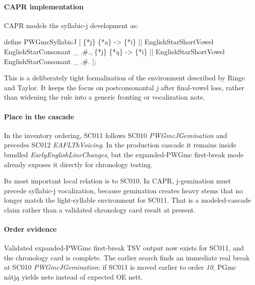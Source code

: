\documentclass[
  british,
  a4paper,
]{article}
\newenvironment{Shaded}{}{}
\newcommand{\NormalTok}[1]{#1}
\begin{document}
\paragraph{CAPR implementation}\label{capr-implementation-8}

CAPR models the syllabic-j development as:

\begin{Shaded}
\begin{Highlighting}[]
\NormalTok{define PWGmcSyllabicJ [}
\NormalTok{    \{*j\} \{*a\} {-}\textgreater{} \{*i\} || EnglishStarShortVowel EnglishStarConsonant \_ .\#.,}
\NormalTok{    \{*j\} \{*ą\} {-}\textgreater{} \{*i\} || EnglishStarShortVowel EnglishStarConsonant \_ .\#.}
\NormalTok{];}
\end{Highlighting}
\end{Shaded}

This is a deliberately tight formalization of the environment described
by Ringe and Taylor. It keeps the focus on postconsonantal \emph{j}
after final-vowel loss, rather than widening the rule into a generic
fronting or vocalization note.

\paragraph{Place in the cascade}\label{place-in-the-cascade-8}

In the inventory ordering, SC011 follows SC010 \emph{PWGmcJGemination}
and precedes SC012 \emph{EAFLThVoicing}. In the production cascade it
remains inside bundled \emph{EarlyEnglishLineChanges}, but the
expanded-PWGmc first-break mode already exposes it directly for
chronology testing.

Its most important local relation is to SC010. In CAPR, j-gemination
must precede syllabic-j vocalization, because gemination creates heavy
stems that no longer match the light-syllable environment for SC011.
That is a modeled-cascade claim rather than a validated chronology card
result at present.

\paragraph{Order evidence}\label{order-evidence-8}

Validated expanded-PWGmc first-break TSV output now exists for SC011,
and the chronology card is complete. The earlier search finds an
immediate real break at SC010 \emph{PWGmcJGemination}: if SC011 is moved
earlier to order \emph{10}, PGmc nátją yields nete instead of expected
OE nett.
\end{document}
